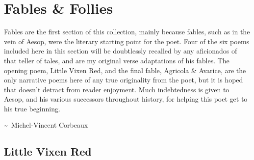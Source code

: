 \chapter*{Fables \& Follies}

Fables are the first section of this collection, mainly because fables, such as in the vein of Aesop, were the literary starting point for the poet. Four of the six poems included here in this section will be doubtlessly recalled by any aficionados of that teller of tales, and are my original verse adaptations of his fables. The opening poem, Little Vixen Red, and the final fable, Agricola \& Avarice, are the only narrative poems here of any true originality from the poet, but it is hoped that doesn’t detract from reader enjoyment. Much indebtedness is given to Aesop, and his various successors throughout history, for helping this poet get to his true beginning.

\vspace{1em}

\textasciitilde\ Michel-Vincent Corbeaux

\newpage
\section*{Little Vixen Red}
\vspace{-5pt}

